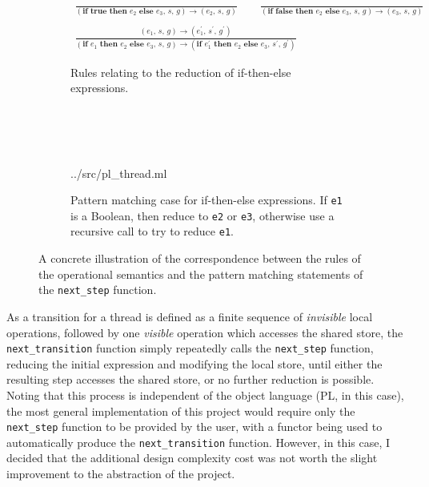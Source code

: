 \documentclass[12pt,a4paper,twoside,openright]{report}
\begin{document}
\begin{figure}
	\begin{subfigure}{\textwidth}
		\begin{gather*}
		\frac{}
		{(\textbf{if true then } e_2 \textbf{ else }
				e_3,\,s,\,g) \rightarrow (e_2,\,s,\,g)}
		\qquad
		\frac{}
		{(\textbf{if false then } e_2 \textbf{ else }
			e_3,\,s,\,g) \rightarrow (e_3,\,s,\,g)} \\
		\\
		\frac{(e_1,\,s,\,g) \rightarrow
			(e_1^{\prime},\,s^{\prime},\,g^{\prime})}
		{(\textbf{if } e_1 \textbf{ then }
			e_2 \textbf{ else } e_3,\,s,\,g)
			\rightarrow (\textbf{if } e_1^{\prime}
			 \textbf{ then }
			e_2 \textbf{ else } e_3,\,
			s^{\prime},\,g^{\prime})}
		\end{gather*}
		\caption{Rules relating to
			the reduction of if-then-else expressions.}
	\end{subfigure}
	\\ \\ \\
	\begin{subfigure}{\textwidth}
		
			{../src/pl_thread.ml}
		\caption{Pattern matching case for if-then-else expressions.
			If \texttt{e1} is a Boolean, then reduce to \texttt{e2} or
			\texttt{e3},
			otherwise use a recursive call to try to reduce \texttt{e1}.}
	\end{subfigure}
	\caption{A concrete illustration of the correspondence
		between the rules of the operational semantics
		and the pattern matching statements of the
		\texttt{next\_step} function.}
	\label{fig:step-rule-correspondence}
\end{figure}

As a transition for a thread is defined as a
finite sequence of \emph{invisible} local
operations, followed by one \emph{visible} operation
which accesses the shared store, the \texttt{next\_transition}
function simply repeatedly calls the \texttt{next\_step}
function, reducing the initial expression and modifying
the local store, until either the resulting step accesses the shared
store, or no further reduction is possible. Noting that this
process is independent of the object language (PL, in this case),
the most general implementation of this project would require
only the  \texttt{next\_step} function to be provided by
the user, with a functor being used to automatically
produce the \texttt{next\_transition} function. However,
in this case, I decided that the additional design complexity
cost was not worth the slight improvement to the abstraction
of the project.
\end{document}
